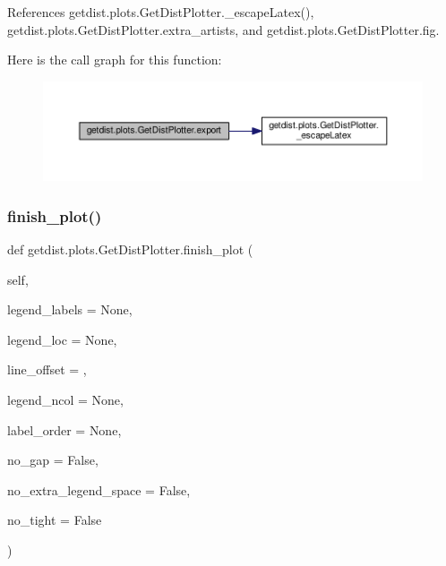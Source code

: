 References getdist.\+plots.\+Get\+Dist\+Plotter.\+\_\+escape\+Latex(), getdist.\+plots.\+Get\+Dist\+Plotter.\+extra\+\_\+artists, and getdist.\+plots.\+Get\+Dist\+Plotter.\+fig.

Here is the call graph for this function\+:
\nopagebreak
\begin{figure}[H]
\begin{center}
\leavevmode
\includegraphics[width=350pt]{classgetdist_1_1plots_1_1GetDistPlotter_ab620b89a8337904ff357c316f040aa53_cgraph}
\end{center}
\end{figure}
\mbox{\label{classgetdist_1_1plots_1_1GetDistPlotter_a2ab4d56845a5abefe27c2d5d62bfb680}} 
\subsubsection{\texorpdfstring{finish\+\_\+plot()}{finish\_plot()}}
{\footnotesize\ttfamily def getdist.\+plots.\+Get\+Dist\+Plotter.\+finish\+\_\+plot (\begin{DoxyParamCaption}\item[{}]{self,  }\item[{}]{legend\+\_\+labels = {\ttfamily None},  }\item[{}]{legend\+\_\+loc = {\ttfamily None},  }\item[{}]{line\+\_\+offset = {},  }\item[{}]{legend\+\_\+ncol = {\ttfamily None},  }\item[{}]{label\+\_\+order = {\ttfamily None},  }\item[{}]{no\+\_\+gap = {\ttfamily False},  }\item[{}]{no\+\_\+extra\+\_\+legend\+\_\+space = {\ttfamily False},  }\item[{}]{no\+\_\+tight = {\ttfamily False} }\end{DoxyParamCaption})}

